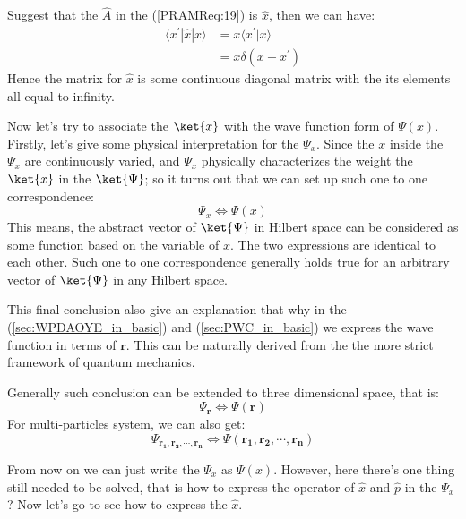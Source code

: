 Suggest that the $\hat{A}$ in the (\ref{PRAMReq:19}) is $\hat{x}$,
then we can have:
\begin{align}
  \label{PRAMReq:26}
\langle x^{'}|\hat{x}|x \rangle &= x \langle x^{'}|x \rangle \nonumber
\\
&= x \delta(x - x^{'})
\end{align}
Hence the matrix for $\hat{x}$ is some continuous diagonal matrix with
the its elements all equal to infinity.

Now let's try to associate the $\ket{x}$ with the wave function form
of $\Psi(x)$. Firstly, let's give some physical interpretation for the
$\Psi_{x}$.  Since the $x$ inside the $\Psi_{x}$ are continuously
varied, and $\Psi_{x}$ physically characterizes the weight the
$\ket{x}$ in the $\ket{\Psi}$; so it turns out that we can set up such
one to one correspondence:
\begin{equation}
\label{PRAMReq:20} \Psi_{x} \Leftrightarrow \Psi(x)
\end{equation}
This means, the abstract vector of $\ket{\Psi}$ in Hilbert space can
be considered as some function based on the variable of $x$. The two
expressions are identical to each other. Such one to one
correspondence generally holds true for an arbitrary vector of
$\ket{\Psi}$ in any Hilbert space.

This final conclusion also give an explanation that why in the
(\ref{sec:WPDAOYE_in_basic}) and (\ref{sec:PWC_in_basic}) we express
the wave function in terms of $\bm{r}$. This can be naturally
derived from the the more strict framework of quantum mechanics.

Generally such conclusion can be extended to three dimensional
space, that is:
\begin{equation}
\label{PRAMReq:21} \Psi_{\bm{r}} \Leftrightarrow \Psi(\bm{r})
\end{equation}
For multi-particles system, we can also get:
\begin{equation}\label{PRAMReq:22}
\Psi_{\bm{r_{1}}, \bm{r_{2}}, \cdots, \bm{r_{n}}} \Leftrightarrow
\Psi(\bm{r_{1}}, \bm{r_{2}}, \cdots, \bm{r_{n}})
\end{equation}

From now on we can just write the $\Psi_{x}$ as $\Psi(x)$. However,
here there's one thing still needed to be solved, that is how to
express the operator of $\hat{x}$ and $\hat{p}$ in the $\Psi_{x}$? Now
let's go to see how to express the $\hat{x}$.

